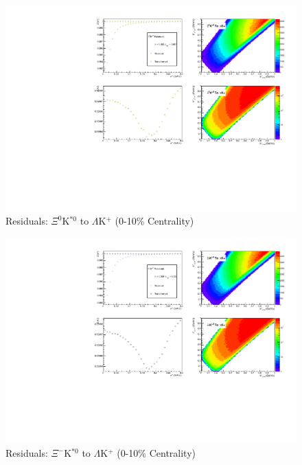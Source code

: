 \documentclass[../AnalysisNoteJBuxton.tex]{subfiles}
\begin{document}
\begin{figure}[h]
  \centering
  \includegraphics[width=\textwidth]{9_AdditionalFigures/Figures/Residuals/LamKchP/Residuals_LamKchP_0010_Xi0KSt0_MomResCrctn_NonFlatBgdCrctn_ResidualsIncluded_UsingCoulombOnlyInterpCfs.pdf}
  \caption[Residuals: $\Xi^{0}$K$^{*0}$ to $\Lambda$K$^{+}$ (0-10\% Centrality)]{Residuals: $\Xi^{0}$K$^{*0}$ to $\Lambda$K$^{+}$ (0-10\% Centrality)}
  \label{fig:Res_LamKchP_0010_Xi0KSt0}
\end{figure}

\begin{figure}[h]
  \centering
  \includegraphics[width=\textwidth]{9_AdditionalFigures/Figures/Residuals/LamKchP/Residuals_LamKchP_0010_XiKSt0_MomResCrctn_NonFlatBgdCrctn_ResidualsIncluded_UsingCoulombOnlyInterpCfs.pdf}
  \caption[Residuals: $\Xi^{-}$K$^{*0}$ to $\Lambda$K$^{+}$ (0-10\% Centrality)]{Residuals: $\Xi^{-}$K$^{*0}$ to $\Lambda$K$^{+}$ (0-10\% Centrality)}
  \label{fig:Res_LamKchP_0010_XiCKSt0}
\end{figure}
\end{document}
